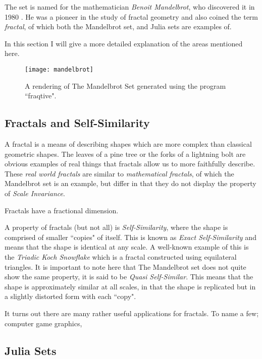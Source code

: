 The set is named for the mathematician \textit{Benoit Mandelbrot}, who discovered it in 1980 \cite{fracnature}\cite{fractimg}. He was a pioneer in the study of 
fractal geometry and also coined the term \textit{fractal}, of which both the Mandelbrot set, and Julia sets are examples of. 

In this section I will give a more detailed explanation of the areas mentioned here. 

\begin{figure}[t]
  \caption{A rendering of The Mandelbrot Set generated using the program ``fraqtive"\cite{fraqtive}.}
  \label{fig:mandelimg}
  \centering
    \texttt{[image: mandelbrot]}
\end{figure}

\subsection*{Fractals and Self-Similarity} 
A fractal is a means of describing shapes which are more complex than classical geometric shapes. The leaves of a pine tree or the forks of a 
lightning bolt are obvious examples of real things that fractals allow us to more faithfully describe. 
These \textit{real world fractals} are similar to \textit{mathematical fractals}, 
of which the Mandelbrot set is an example, but differ in that they do not display the property of \textit{Scale Invariance}. 

Fractals have a fractional dimension. %
 
A property of fractals (but not all) is \textit{Self-Similarity}, where the shape is comprised of smaller ``copies" of itself. 
This is known as \textit{Exact Self-Similarity} and means that the shape is identical at any scale.
A well-known example of this is the \textit{Triadic Koch Snowflake} which is a fractal constructed using equilateral triangles. 
It is important to note here that The Mandelbrot set does not quite show the same property, it is said to be 
\textit{Quasi Self-Similar}. This means that the shape is approximately similar at all scales, in that the shape is replicated but in a slightly distorted
form with each ``copy".

It turns out there are many rather useful applications for fractals. To name a few; computer game graphics, %

\subsection*{Julia Sets}

